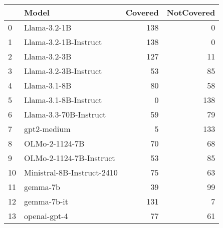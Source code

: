 \begin{tabular}{llrr}
\toprule
 & Model & Covered & NotCovered \\
\midrule
0 & Llama-3.2-1B & 138 & 0 \\
1 & Llama-3.2-1B-Instruct & 138 & 0 \\
2 & Llama-3.2-3B & 127 & 11 \\
3 & Llama-3.2-3B-Instruct & 53 & 85 \\
4 & Llama-3.1-8B & 80 & 58 \\
5 & Llama-3.1-8B-Instruct & 0 & 138 \\
6 & Llama-3.3-70B-Instruct & 59 & 79 \\
7 & gpt2-medium & 5 & 133 \\
8 & OLMo-2-1124-7B & 70 & 68 \\
9 & OLMo-2-1124-7B-Instruct & 53 & 85 \\
10 & Ministral-8B-Instruct-2410 & 75 & 63 \\
11 & gemma-7b & 39 & 99 \\
12 & gemma-7b-it & 131 & 7 \\
13 & openai-gpt-4 & 77 & 61 \\
\bottomrule
\end{tabular}

